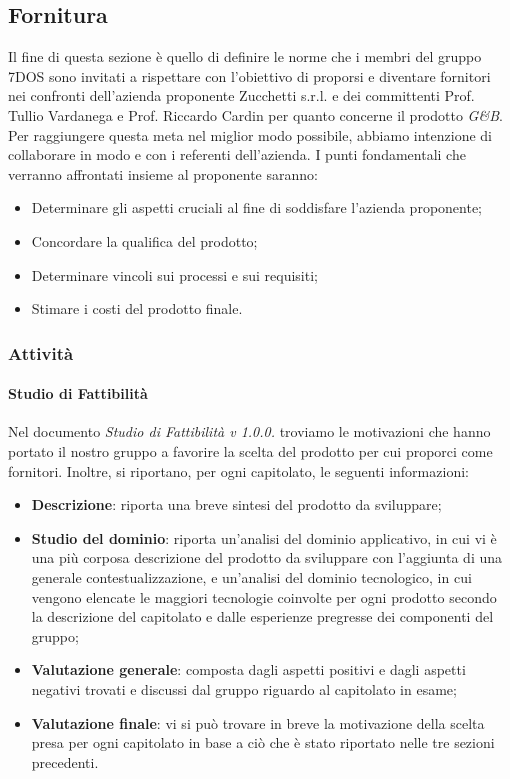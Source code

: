 \subsection{Fornitura}
Il fine di questa sezione è quello di definire le norme che i membri del gruppo 7DOS sono invitati a rispettare con l'obiettivo di proporsi e diventare fornitori nei confronti dell'azienda proponente Zucchetti s.r.l. e dei committenti Prof. Tullio Vardanega e Prof. Riccardo Cardin per quanto concerne il prodotto \emph{G\&B}.
Per raggiungere questa meta nel miglior modo possibile, abbiamo intenzione di collaborare in modo  e  con i referenti dell'azienda.
I punti fondamentali che verranno affrontati insieme al proponente saranno:
\begin{itemize}
\item Determinare gli aspetti cruciali al fine di soddisfare l'azienda proponente;
\item Concordare la qualifica del prodotto;
\item Determinare vincoli sui processi e sui requisiti;
\item Stimare i costi del prodotto finale.
\end{itemize}
\subsubsection{Attività}
\paragraph{Studio di Fattibilità}\Spazio
Nel documento \emph{Studio di Fattibilità v 1.0.0.} troviamo le motivazioni che hanno portato il nostro gruppo a favorire la scelta del prodotto per cui proporci come fornitori. Inoltre, si riportano, per ogni capitolato, le seguenti informazioni:
\begin{itemize}
 	\item\textbf{{Descrizione}}: riporta una breve sintesi del prodotto da sviluppare;
 	\item\textbf{{Studio del dominio}}: riporta un'analisi del dominio applicativo, in cui vi è una più corposa descrizione del prodotto da sviluppare con l'aggiunta di una generale contestualizzazione, e un'analisi del dominio tecnologico, in cui vengono elencate le maggiori tecnologie coinvolte per ogni prodotto secondo la descrizione del capitolato e dalle esperienze pregresse dei componenti del gruppo;
 	\item\textbf{{Valutazione generale}}: composta dagli aspetti positivi e dagli aspetti negativi trovati e discussi dal gruppo riguardo al capitolato in esame;
 	\item\textbf{{Valutazione finale}}: vi si può trovare in breve la motivazione della scelta presa per ogni capitolato in base a ciò che è stato riportato nelle tre sezioni precedenti.
\end{itemize}
\pagebreak
